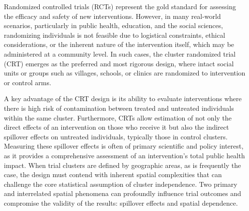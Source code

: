 \documentclass{article}[11pt]
\begin{document}
Randomized controlled trials (RCTs) represent the gold standard for assessing the efficacy and safety of new interventions\cite{pocock_clinical_1983}\cite{smith_field_2015}. However, in many real-world scenarios, particularly in public health, education, and the social sciences, randomizing individuals is not feasible due to logistical constraints, ethical considerations, or the inherent nature of the intervention itself, which may be administered at a community level. In such cases, the cluster randomized trial (CRT) emerges as the preferred and most rigorous design, where intact social units or groups such as villages, schools, or clinics are randomized to intervention or control arms\cite{hayes_cluster_2017}\cite{donner_design_2000}.

A key advantage of the CRT design is its ability to evaluate interventions where there is high risk of contamination between treated and untreated individuals within the same cluster\cite{hayes_cluster_2017}\cite{hudgens_toward_2008}. Furthermore, CRTs allow estimation of not only the direct effects of an intervention on those who receive it but also the indirect spillover effects on untreated individuals, typically those in control clusters. Measuring these spillover effects is often of primary scientific and policy interest, as it provides a comprehensive assessment of an intervention's total public health impact\cite{hayes_cluster_2017}\cite{hayes_design_2000}. When trial clusters are defined by geographic areas, as is frequently the case, the design must contend with inherent spatial complexities that can challenge the core statistical assumption of cluster independence. Two primary and interrelated spatial phenomena can profoundly influence trial outcomes and compromise the validity of the results: spillover effects and spatial dependence\cite{hayes_cluster_2017}\cite{smith_field_2015}.
\end{document}
